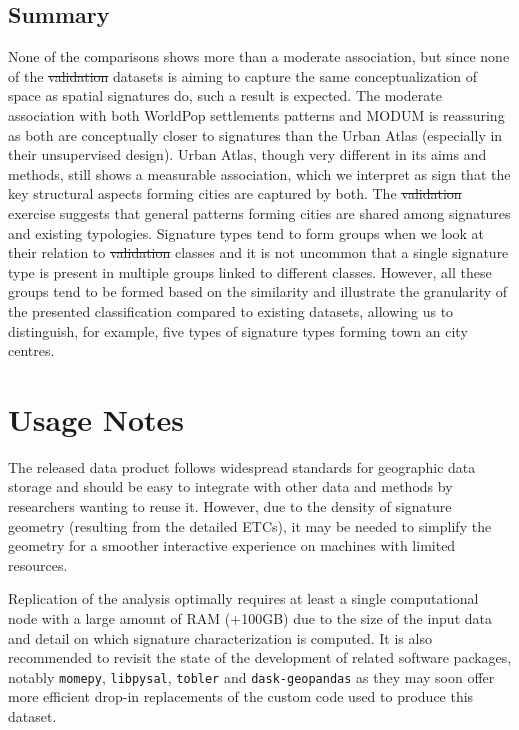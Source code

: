 \documentclass[fleqn,10pt]{wlscirep}
\providecommand{\DIFadd}[1]{{\protect\color{blue}\uwave{#1}}} %
\providecommand{\DIFdel}[1]{{\protect\color{red}\sout{#1}}}                      %
\providecommand{\DIFaddbegin}{} %
\providecommand{\DIFaddend}{} %
\providecommand{\DIFdelbegin}{} %
\providecommand{\DIFdelend}{} %
\begin{document}
\DIFaddend \subsection*{Summary}
None of the comparisons shows more than a moderate association, but since none of the
\DIFdelbegin \DIFdel{validation }\DIFdelend \DIFaddbegin \DIFadd{comparison }\DIFaddend datasets is aiming to capture the same conceptualization of space as spatial
signatures do, such a result is expected. The moderate association with both WorldPop
settlements patterns and MODUM is reassuring as both are conceptually closer to
signatures than the Urban Atlas (especially in their unsupervised design). Urban Atlas,
though very different in its aims and methods, still shows a measurable association,
which we interpret as sign that the key structural aspects forming cities are captured by both. The
\DIFdelbegin \DIFdel{validation }\DIFdelend \DIFaddbegin \DIFadd{comparison }\DIFaddend exercise suggests that general patterns forming cities are shared among
signatures and existing typologies. Signature types tend to form groups when we look at
their relation to \DIFdelbegin \DIFdel{validation }\DIFdelend \DIFaddbegin \DIFadd{comparison }\DIFaddend classes and it is not uncommon that a single signature type
is present in multiple groups linked to different classes. However, all these groups
tend to be formed based on the similarity and illustrate the granularity of the
presented classification compared to existing datasets, allowing us to distinguish, for
example, five types of signature types forming town an city centres.


\section*{Usage Notes}

The released data product follows widespread standards for geographic data storage and
should be easy to integrate with other data and methods by researchers wanting to reuse it. However, due to the density of
signature geometry (resulting from the detailed ETCs), it may be needed to simplify the
geometry for a smoother interactive experience on machines with limited resources.

Replication of the analysis optimally requires at least a single computational node with
a large amount of RAM (+100GB) due to the size of the input data and detail on which
signature characterization is computed. It is also recommended to revisit the state of
the development of related software packages, notably
\texttt{momepy}\cite{fleischmann_2019}, \texttt{libpysal}\cite{rey2021pysal},
\texttt{tobler}\cite{eli_knaap_2021_5047613} and
\texttt{dask-geopandas} as they may soon offer more efficient drop-in replacements
of the custom code used to produce this dataset.
\end{document}
